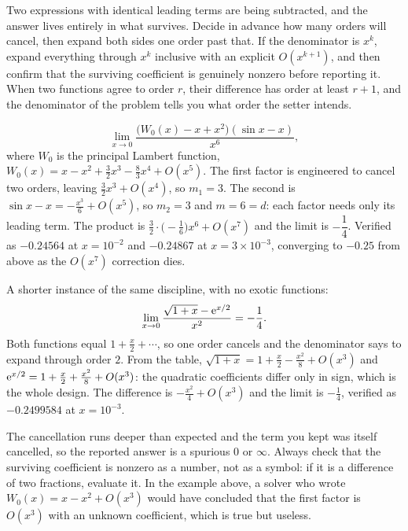 \cue Two expressions with identical leading terms are being subtracted, and the answer lives entirely in what survives.
\method Decide in advance how many orders will cancel, then expand both sides one order past that. If the denominator is $x^{k}$, expand everything through $x^{k}$ inclusive with an explicit $O(x^{k+1})$, and then confirm that the surviving coefficient is genuinely nonzero before reporting it. When two functions agree to order $r$, their difference has order at least $r+1$, and the denominator of the problem tells you what order the setter intends.

\begin{worked}
\[
\lim_{x\to0}\frac{\bigl(W_0(x)-x+x^{2}\bigr)(\sin x-x)}{x^{6}},
\]
where $W_0$ is the principal Lambert function, $W_0(x)=x-x^{2}+\tfrac32x^{3}-\tfrac83x^{4}+O(x^{5})$. The first factor is engineered to cancel two orders, leaving $\tfrac32x^{3}+O(x^{4})$, so $m_1=3$. The second is $\sin x-x=-\tfrac{x^{3}}{6}+O(x^{5})$, so $m_2=3$ and $m=6=d$: each factor needs only its leading term. The product is $\tfrac32\cdot\bigl(-\tfrac16\bigr)x^{6}+O(x^{7})$ and the limit is $-\dfrac14$. Verified as $-0.24564$ at $x=10^{-2}$ and $-0.24867$ at $x=3\times10^{-3}$, converging to $-0.25$ from above as the $O(x^{7})$ correction dies.

A shorter instance of the same discipline, with no exotic functions:
\[
\lim_{x\to0}\frac{\sqrt{1+x}-\mathrm{e}^{x/2}}{x^{2}}=-\frac14 .
\]
Both functions equal $1+\tfrac{x}{2}+\cdots$, so one order cancels and the denominator says to expand through order $2$. From the table, $\sqrt{1+x}=1+\tfrac{x}{2}-\tfrac{x^{2}}{8}+O(x^{3})$ and $\mathrm{e}^{x/2}=1+\tfrac{x}{2}+\tfrac{x^{2}}{8}+O(x^{3})$: the quadratic coefficients differ only in sign, which is the whole design. The difference is $-\tfrac{x^{2}}{4}+O(x^{3})$ and the limit is $-\tfrac14$, verified as $-0.2499584$ at $x=10^{-3}$.
\end{worked}

\begin{trap}
The cancellation runs deeper than expected and the term you kept was itself cancelled, so the reported answer is a spurious $0$ or $\infty$. Always check that the surviving coefficient is nonzero as a number, not as a symbol: if it is a difference of two fractions, evaluate it. In the example above, a solver who wrote $W_0(x)=x-x^{2}+O(x^{3})$ would have concluded that the first factor is $O(x^{3})$ with an unknown coefficient, which is true but useless.
\end{trap}

